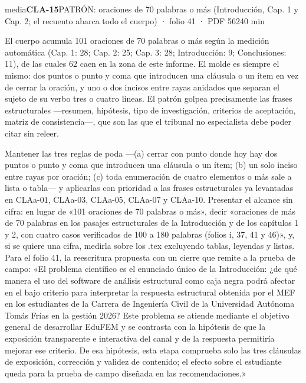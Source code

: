 \begin{ficha}{media}{\casilla\textbf{CLA-15}\quad{}\quad PATRÓN: oraciones de 70 palabras o más (Introducción, Cap. 1 y Cap. 2; el recuento abarca todo el cuerpo) · folio 41 · PDF 56\hfill 240 min}
\par
{}El cuerpo acumula 101 oraciones de 70 palabras o más según la medición automática (Cap. 1: 28; Cap. 2: 25; Cap. 3: 28; Introducción: 9; Conclusiones: 11), de las cuales 62 caen en la zona de este informe. El molde es siempre el mismo: dos puntos o punto y coma que introducen una cláusula o un ítem en vez de cerrar la oración, y uno o dos incisos entre rayas anidados que separan el sujeto de su verbo tres o cuatro líneas. El patrón golpea precisamente las frases estructurales —resumen, hipótesis, tipo de investigación, criterios de aceptación, matriz de consistencia—, que son las que el tribunal no especialista debe poder citar sin releer.\par
{}Mantener las tres reglas de poda —(a) cerrar con punto donde hoy hay dos puntos o punto y coma que introducen una cláusula o un ítem; (b) un solo inciso entre rayas por oración; (c) toda enumeración de cuatro elementos o más sale a lista o tabla— y aplicarlas con prioridad a las frases estructurales ya levantadas en CLAa-01, CLAa-03, CLAa-05, CLAa-07 y CLAa-10. Presentar el alcance sin cifra: en lugar de «101 oraciones de 70 palabras o más», decir «oraciones de más de 70 palabras en los pasajes estructurales de la Introducción y de los capítulos 1 y 2, con cuatro casos verificados de 100 a 180 palabras (folios i, 37, 41 y 46)», y, si se quiere una cifra, medirla sobre los .tex excluyendo tablas, leyendas y listas. Para el folio 41, la reescritura propuesta con un cierre que remite a la prueba de campo: «El problema científico es el enunciado único de la Introducción: ¿de qué manera el uso del software de análisis estructural como caja negra podrá afectar en el bajo criterio para interpretar la respuesta estructural obtenida por el MEF en los estudiantes de la Carrera de Ingeniería Civil de la Universidad Autónoma Tomás Frías en la gestión 2026? Este problema se atiende mediante el objetivo general de desarrollar EduFEM y se contrasta con la hipótesis de que la exposición transparente e interactiva del canal y de la respuesta permitiría mejorar ese criterio. De esa hipótesis, esta etapa comprueba solo las tres cláusulas de exposición, corrección y validez de contenido; el efecto sobre el estudiante queda para la prueba de campo diseñada en las recomendaciones.»\par

\end{ficha}
